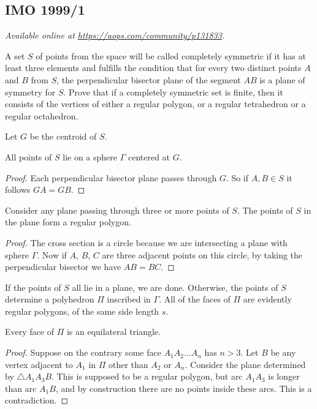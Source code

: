 \documentclass[11pt]{scrartcl}
\begin{document}
\subsection{IMO 1999/1}
\textsl{Available online at \url{https://aops.com/community/p131833}.}
\begin{mdframed}[style=mdpurplebox,frametitle={Problem statement}]
A set $S$ of points from the space will be called
completely symmetric if it has at least three elements
and fulfills the condition that for every two distinct points
$A$ and $B$ from $S$,
the perpendicular bisector plane of the segment $AB$
is a plane of symmetry for $S$.
Prove that if a completely symmetric set is finite,
then it consists of the vertices of either a regular polygon,
or a regular tetrahedron or a regular octahedron.
\end{mdframed}
Let $G$ be the centroid of $S$.

\begin{claim*}
  All points of $S$ lie on a sphere $\Gamma$ centered at $G$.
\end{claim*}
\begin{proof}
  Each perpendicular bisector plane passes through $G$.
  So if $A,B \in S$ it follows $GA = GB$.
\end{proof}

\begin{claim*}
  Consider any plane passing through three or more points of $S$.
  The points of $S$ in the plane form a regular polygon.
\end{claim*}
\begin{proof}
  The cross section is a circle because we are intersecting
  a plane with sphere $\Gamma$.
  Now if $A$, $B$, $C$ are three adjacent points on this circle,
  by taking the perpendicular bisector we have $AB=BC$.
\end{proof}

If the points of $S$ all lie in a plane, we are done.
Otherwise, the points of $S$ determine a polyhedron
$\Pi$ inscribed in $\Gamma$.
All of the faces of $\Pi$ are evidently regular polygons,
of the same side length $s$.

\begin{claim*}
  Every face of $\Pi$ is an equilateral triangle.
\end{claim*}
\begin{proof}
  Suppose on the contrary some face $A_1 A_2 \dots A_n$
  has $n > 3$.
  Let $B$ be any vertex adjacent to $A_1$ in $\Pi$
  other than $A_2$ or $A_n$.
  Consider the plane determined by $\triangle A_1 A_3 B$.
  This is supposed to be a regular polygon,
  but arc $A_1 A_3$ is longer than arc $A_1 B$,
  and by construction there are no points inside these arcs.
  This is a contradiction.
\end{proof}
\end{document}
